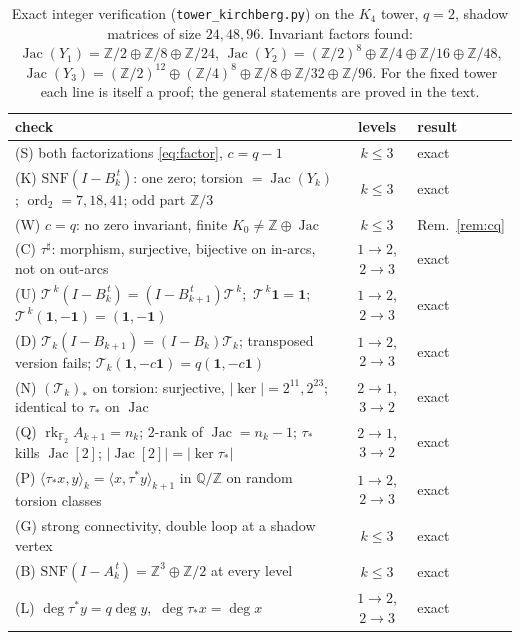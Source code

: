 \documentclass[11pt]{amsart}
\numberwithin{equation}{section}
\theoremstyle{definition}
\theoremstyle{remark}
\newcommand{\Z}{\mathbb{Z}}
\newcommand{\Q}{\mathbb{Q}}
\newcommand{\F}{\mathbb{F}}
\newcommand{\cT}{\mathcal{T}}
\newcommand{\Jac}{\operatorname{Jac}}
\newcommand{\ord}{\operatorname{ord}}
\newcommand{\rk}{\operatorname{rk}}
\newcommand{\ta}{\tau_*}
\newcommand{\taup}{\tau^*}
\newcommand{\shadow}[1]{{#1}^{\sharp}}
\newcommand{\Tup}{\cT^{\,k}}
\newcommand{\Tdn}{\cT_{k}}
\begin{document}
\begin{table}[ht]
\centering\footnotesize
\renewcommand{\arraystretch}{1.2}
\begin{tabular}{p{10.6cm}cl}
\toprule
check & levels & result\\
\midrule
(S) both factorizations \eqref{eq:factor}, $c=q-1$ & $k\le3$ & exact\\
(K) $\mathrm{SNF}(I-B_k^{\,t})$: one zero; torsion $=\Jac(Y_k)$; $\ord_2=7,18,41$; odd part $\Z/3$ & $k\le3$ & exact\\
(W) $c=q$: no zero invariant, finite $K_0\ne\Z\oplus\Jac$ & $k\le3$ & Rem.~\ref{rem:cq}\\
(C) $\shadow\tau$: morphism, surjective, bijective on in-arcs, not on out-arcs & $1\to2$, $2\to3$ & exact\\
(U) $\Tup(I-B_k^{\,t})=(I-B_{k+1}^{\,t})\Tup$;\ $\Tup\mathbf1=\mathbf1$;\ $\Tup(\mathbf1,-\mathbf1)=(\mathbf1,-\mathbf1)$ & $1\to2$, $2\to3$ & exact\\
(D) $\Tdn(I-B_{k+1})=(I-B_k)\Tdn$; transposed version fails; $\Tdn(\mathbf1,-c\mathbf1)=q(\mathbf1,-c\mathbf1)$ & $1\to2$, $2\to3$ & exact\\
(N) $(\Tdn)_*$ on torsion: surjective, $|\ker|=2^{11},2^{23}$; identical to $\ta$ on $\Jac$ & $2\to1$, $3\to2$ & exact\\
(Q) $\rk_{\F_2}A_{k+1}=n_k$; $2$-rank of $\Jac=n_k-1$; $\ta$ kills $\Jac[2]$; $|\Jac[2]|=|\ker\ta|$ & $2\to1$, $3\to2$ & exact\\
(P) $\langle\ta x,y\rangle_k=\langle x,\taup y\rangle_{k+1}$ in $\Q/\Z$ on random torsion classes & $1\to2$, $2\to3$ & exact\\
(G) strong connectivity, double loop at a shadow vertex & $k\le3$ & exact\\
(B) $\mathrm{SNF}(I-A_k^{\,t})=\Z^3\oplus\Z/2$ at every level & $k\le3$ & exact\\
(L) $\deg\taup y=q\deg y$,\ $\deg\ta x=\deg x$ & $1\to2$, $2\to3$ & exact\\
\bottomrule
\end{tabular}
\medskip
\caption{Exact integer verification (\texttt{tower\_kirchberg.py}) on the $K_4$ tower,
$q=2$, shadow matrices of size $24,48,96$. Invariant factors found:
$\Jac(Y_1)=\Z/2\oplus\Z/8\oplus\Z/24$, $\Jac(Y_2)=(\Z/2)^8\oplus\Z/4\oplus\Z/16\oplus\Z/48$,
$\Jac(Y_3)=(\Z/2)^{12}\oplus(\Z/4)^8\oplus\Z/8\oplus\Z/32\oplus\Z/96$. For the fixed tower
each line is itself a proof; the general statements are proved in the text.}
\label{tab:battery}
\end{table}
\end{document}
